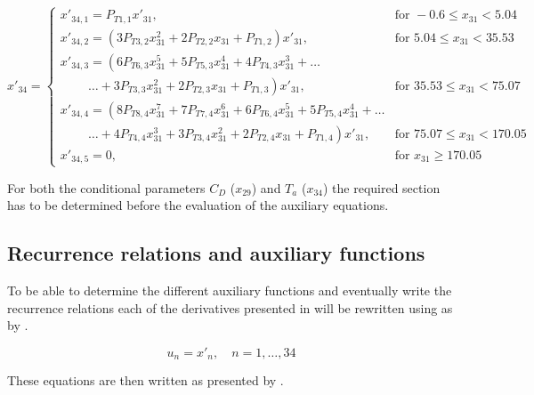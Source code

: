 \begin{equation}\label{eq:TCondDerAux}
x'_{34}=\begin{cases}
x'_{34,1}=P_{T 1,1}x'_{31}, & \text{for } -0.6 \leq x_{31} < 5.04  \\
x'_{34,2}=\left(3P_{T 3,2}x_{31}^{2}+2P_{T 2,2}x_{31}+P_{T 1,2}\right)x'_{31}, &  \text{for } 5.04\leq x_{31} < 35.53   \\
x'_{34,3}=\left(6 P_{T 6,3}x_{31}^{5}+5P_{T 5,3}x_{31}^{4}+4P_{T 4,3}x_{31}^{3}+ \dots
\right. \\
\qquad\  \left. \dotsc +3P_{T 3,3}x_{31}^{2}+2P_{T 2,3}x_{31}+P_{T 1,3}\right)x'_{31}, &  \text{for } 35.53\leq x_{31} < 75.07   \\
x'_{34,4}=\left(8 P_{T 8,4}x_{31}^{7}+7P_{T 7,4}x_{31}^{6}+6P_{T 6,4}x_{31}^{5}
+5P_{T 5,4}x_{31}^{4}+ \dots \right. \\
\qquad\  \left. \dotsc +4P_{T 4,4}x_{31}^{3}+3P_{T 3,4}x_{31}^{2}+2P_{T 2,4}x_{31}+P_{T 1,4}\right)x'_{31}, &  \text{for } 75.07\leq x_{31} < 170.05   \\
x'_{34,5}=0, &  \text{for }  x_{31} \geq 170.05   
\end{cases}
\end{equation}


For both the conditional parameters $C_{D}$ ($x_{29}$) and $T_{a}$ ($x_{34}$) the required section has to be determined before the evaluation of the auxiliary equations. 

\subsection{Recurrence relations and auxiliary functions}
\label{subsec:recRelAuxFunc}
To be able to determine the different auxiliary functions and eventually write the recurrence relations each of the derivatives presented in  will be rewritten using  as by \cite{scott2008high}. 

\begin{equation} \label{eq:un}
u_{n}=x'_{n}, \quad n=1,\dotsc,34
\end{equation}

These equations are then written as presented by .

